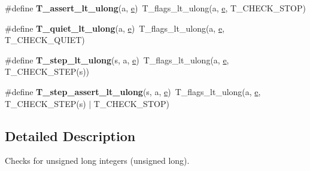 \begin{DoxyCompactItemize}
\item 
\mbox{\label{group__RTEMSTestFrameworkChecksULong_ga1b8fada3a56431ac7fa03f8dc1f4dc17}} 
\#define {\bfseries T\+\_\+assert\+\_\+lt\+\_\+ulong}(a,  \mbox{\hyperlink{sun4u_2tte_8h_a8b0b9ed08e0e18920ec2682f48228c27}{e}})~T\+\_\+flags\+\_\+lt\+\_\+ulong(a, \mbox{\hyperlink{sun4u_2tte_8h_a8b0b9ed08e0e18920ec2682f48228c27}{e}}, T\+\_\+\+C\+H\+E\+C\+K\+\_\+\+S\+T\+OP)
\item 
\mbox{\label{group__RTEMSTestFrameworkChecksULong_gabba53ee92f1606eb08866ed44be51228}} 
\#define {\bfseries T\+\_\+quiet\+\_\+lt\+\_\+ulong}(a,  \mbox{\hyperlink{sun4u_2tte_8h_a8b0b9ed08e0e18920ec2682f48228c27}{e}})~T\+\_\+flags\+\_\+lt\+\_\+ulong(a, \mbox{\hyperlink{sun4u_2tte_8h_a8b0b9ed08e0e18920ec2682f48228c27}{e}}, T\+\_\+\+C\+H\+E\+C\+K\+\_\+\+Q\+U\+I\+ET)
\item 
\mbox{\label{group__RTEMSTestFrameworkChecksULong_ga3f3866b436c6ab1fad1ebc3152c9f88d}} 
\#define {\bfseries T\+\_\+step\+\_\+lt\+\_\+ulong}(s,  a,  \mbox{\hyperlink{sun4u_2tte_8h_a8b0b9ed08e0e18920ec2682f48228c27}{e}})~T\+\_\+flags\+\_\+lt\+\_\+ulong(a, \mbox{\hyperlink{sun4u_2tte_8h_a8b0b9ed08e0e18920ec2682f48228c27}{e}}, T\+\_\+\+C\+H\+E\+C\+K\+\_\+\+S\+T\+EP(s))
\item 
\mbox{\label{group__RTEMSTestFrameworkChecksULong_ga22c8f69112c79bdd99ca83e6821a20d1}} 
\#define {\bfseries T\+\_\+step\+\_\+assert\+\_\+lt\+\_\+ulong}(s,  a,  \mbox{\hyperlink{sun4u_2tte_8h_a8b0b9ed08e0e18920ec2682f48228c27}{e}})~T\+\_\+flags\+\_\+lt\+\_\+ulong(a, \mbox{\hyperlink{sun4u_2tte_8h_a8b0b9ed08e0e18920ec2682f48228c27}{e}}, T\+\_\+\+C\+H\+E\+C\+K\+\_\+\+S\+T\+EP(s) $\vert$ T\+\_\+\+C\+H\+E\+C\+K\+\_\+\+S\+T\+OP)
\end{DoxyCompactItemize}


\subsection{Detailed Description}
Checks for unsigned long integers (unsigned long). 

